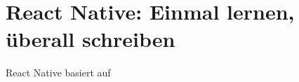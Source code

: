 \section{React Native: Einmal lernen, überall schreiben}
\label{reactnative}

React Native basiert auf 